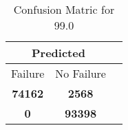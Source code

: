 \begin{table}[] 
\caption{Confusion Matric for 99.0} 
\label{Table: Prediction Accuracy-DMD99.0OnlySunEKF-ignoreReflectionEKF-top2-Reflection} 
\centering 
\begin{tabular} 
 {@{}ccc@{}} 
\toprule 
\multicolumn{2}{c}{\textbf{Predicted}}
 \\ \midrule 
\multicolumn{1}{|c|}{Failure} & 
\multicolumn{1}{c|}{No Failure}
 \\ \midrule 
\multicolumn{1}{|c|}{\color{green}\textbf{74162}} & 
\multicolumn{1}{c|}{\color{red}\textbf{2568}}
 \\ \midrule 
\multicolumn{1}{|c|}{\color{red}\textbf{0}} & 
\multicolumn{1}{c|}{\color{green}\textbf{93398}}
 \\ \bottomrule 
\end{tabular} 
\end{table} 
